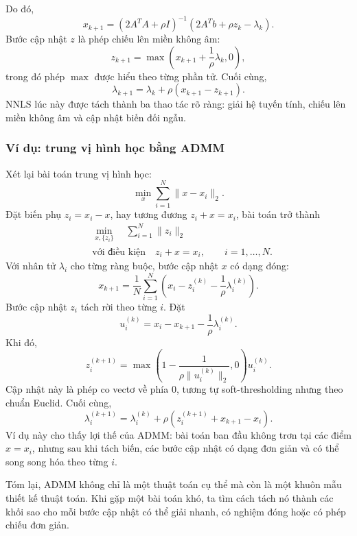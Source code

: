 Do đó,
\begin{equation}
    x_{k+1}
    =
    (2A^{T}A+\rho I)^{-1}(2A^{T}b+\rho z_k-\lambda_k).
    \label{eq_nnls_x_update}
\end{equation}
Bước cập nhật $z$ là phép chiếu lên miền không âm:
\begin{equation}
    z_{k+1}
    =
    \max\left(x_{k+1}+\frac{1}{\rho}\lambda_k,0\right),
    \label{eq_nnls_z_update}
\end{equation}
trong đó phép $\max$ được hiểu theo từng phần tử. Cuối cùng,
\begin{equation}
    \lambda_{k+1}
    =
    \lambda_k+\rho(x_{k+1}-z_{k+1}).
    \label{eq_nnls_lambda_update}
\end{equation}
NNLS lúc này được tách thành ba thao tác rõ ràng: giải hệ tuyến tính, chiếu lên miền không âm và cập nhật biến đối ngẫu.

\subsubsection*{Ví dụ: trung vị hình học bằng ADMM}
Xét lại bài toán trung vị hình học:
\begin{equation}
    \min_x \sum_{i=1}^{N}\|x-x_i\|_2.
    \label{eq_admm_geomedian_original}
\end{equation}
Đặt biến phụ $z_i=x_i-x$, hay tương đương $z_i+x=x_i$, bài toán trở thành
\begin{equation}
    \begin{aligned}
        &\min_{x,\{z_i\}}\quad \sum_{i=1}^{N}\|z_i\|_2\\
        &\text{với điều kiện}\quad z_i+x=x_i,\qquad i=1,\dots,N.
    \end{aligned}
    \label{eq_admm_geomedian_split}
\end{equation}
Với nhân tử $\lambda_i$ cho từng ràng buộc, bước cập nhật $x$ có dạng đóng:
\begin{equation}
    x_{k+1}
    =
    \frac{1}{N}\sum_{i=1}^{N}
    \left(x_i-z_i^{(k)}-\frac{1}{\rho}\lambda_i^{(k)}\right).
    \label{eq_admm_geomedian_x_update}
\end{equation}
Bước cập nhật $z_i$ tách rời theo từng $i$. Đặt
\begin{equation}
    u_i^{(k)}
    =
    x_i-x_{k+1}-\frac{1}{\rho}\lambda_i^{(k)}.
    \label{eq_admm_geomedian_u}
\end{equation}
Khi đó,
\begin{equation}
    z_i^{(k+1)}
    =
    \max\left(1-\frac{1}{\rho\|u_i^{(k)}\|_2},0\right)u_i^{(k)}.
    \label{eq_admm_geomedian_z_update}
\end{equation}
Cập nhật này là phép co vectơ về phía $0$, tương tự soft-thresholding nhưng theo chuẩn Euclid. Cuối cùng,
\begin{equation}
    \lambda_i^{(k+1)}
    =
    \lambda_i^{(k)}+\rho(z_i^{(k+1)}+x_{k+1}-x_i).
    \label{eq_admm_geomedian_lambda_update}
\end{equation}
Ví dụ này cho thấy lợi thế của ADMM: bài toán ban đầu không trơn tại các điểm $x=x_i$, nhưng sau khi tách biến, các bước cập nhật có dạng đơn giản và có thể song song hóa theo từng $i$.
\medskip

Tóm lại, ADMM không chỉ là một thuật toán cụ thể mà còn là một khuôn mẫu thiết kế thuật toán. Khi gặp một bài toán khó, ta tìm cách tách nó thành các khối sao cho mỗi bước cập nhật có thể giải nhanh, có nghiệm đóng hoặc có phép chiếu đơn giản.
